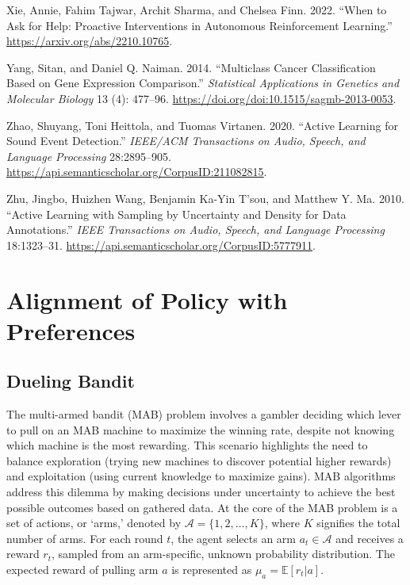 \documentclass[
  letterpaper,
  numbers=noenddot,
  DIV=11]{scrreprt}
\newlength{\cslhangindent}
\newenvironment{CSLReferences}[2] %
 {\begin{list}{}{%
  \setlength{\itemindent}{0pt}
  \setlength{\leftmargin}{0pt}
  \setlength{\parsep}{0pt}
  \ifodd #1
   \setlength{\leftmargin}{\cslhangindent}
   \setlength{\itemindent}{-1\cslhangindent}
  \fi
  \setlength{\itemsep}{#2\baselineskip}}}
 {\end{list}}
\let\oldchapter\chapter
\def\chapter{%
  \setcounter{sidenote}{1}%
  \oldchapter
}
\theoremstyle{definition}
\theoremstyle{plain}
\theoremstyle{plain}
\theoremstyle{remark}
\begin{document}
\begin{CSLReferences}{1}{0}
Xie, Annie, Fahim Tajwar, Archit Sharma, and Chelsea Finn. 2022. {``When
to Ask for Help: Proactive Interventions in Autonomous Reinforcement
Learning.''} \url{https://arxiv.org/abs/2210.10765}.

Yang, Sitan, and Daniel Q. Naiman. 2014. {``Multiclass Cancer
Classification Based on Gene Expression Comparison.''} \emph{Statistical
Applications in Genetics and Molecular Biology} 13 (4): 477--96.
\url{https://doi.org/doi:10.1515/sagmb-2013-0053}.

Zhao, Shuyang, Toni Heittola, and Tuomas Virtanen. 2020. {``Active
Learning for Sound Event Detection.''} \emph{IEEE/ACM Transactions on
Audio, Speech, and Language Processing} 28:2895--905.
\url{https://api.semanticscholar.org/CorpusID:211082815}.

Zhu, Jingbo, Huizhen Wang, Benjamin Ka-Yin T'sou, and Matthew Y. Ma.
2010. {``Active Learning with Sampling by Uncertainty and Density for
Data Annotations.''} \emph{IEEE Transactions on Audio, Speech, and
Language Processing} 18:1323--31.
\url{https://api.semanticscholar.org/CorpusID:5777911}.

\end{CSLReferences}


\chapter{Alignment of Policy with
Preferences}\label{alignment-of-policy-with-preferences}

\section{Dueling Bandit}\label{dueling-bandit}

The multi-armed bandit (MAB) problem involves a gambler deciding which
lever to pull on an MAB machine to maximize the winning rate, despite
not knowing which machine is the most rewarding. This scenario
highlights the need to balance exploration (trying new machines to
discover potential higher rewards) and exploitation (using current
knowledge to maximize gains). MAB algorithms address this dilemma by
making decisions under uncertainty to achieve the best possible outcomes
based on gathered data. At the core of the MAB problem is a set of
actions, or `arms,' denoted by \(\mathcal{A} = \{1, 2, \ldots, K\}\),
where \(K\) signifies the total number of arms. For each round \(t\),
the agent selects an arm \(a_t \in \mathcal{A}\) and receives a reward
\(r_t\), sampled from an arm-specific, unknown probability distribution.
The expected reward of pulling arm \(a\) is represented as
\(\mu_a = \mathbb{E}[r_t | a]\).
\end{document}
